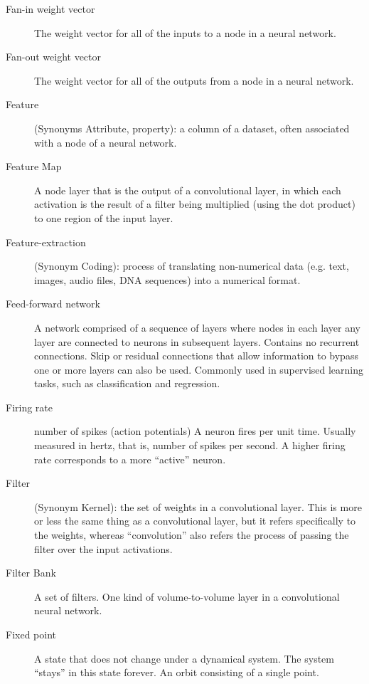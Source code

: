 \begin{description}
\item[Fan-in weight vector] The weight vector for all of the inputs to a node in a neural network.

\item[Fan-out weight vector] The weight vector for all of the outputs from a node in a neural network.

\item[Feature] (Synonyms Attribute, property): a column of a dataset, often associated with a node of a neural network.

\item[Feature Map] A node layer that is the output of a convolutional layer, in which each activation is the result of a filter being multiplied (using the dot product) to one region of the input layer.

\item[Feature-extraction] (Synonym Coding):  process of translating non-numerical data (e.g. text, images, audio files, DNA sequences) into a numerical format. %

\item[Feed-forward network] A network comprised of a sequence of layers where nodes in each layer any layer are connected to neurons in subsequent layers. Contains no recurrent connections. Skip or residual connections that allow information to bypass one or more layers can also be used. Commonly used in supervised learning tasks, such as classification and regression.

\item[Firing rate] number of spikes (action potentials) A neuron fires per unit time. Usually measured in hertz, that is, number of spikes per second. A higher firing rate corresponds to a more ``active'' neuron. 

\item[Filter] (Synonym Kernel): the set of weights in a convolutional layer. This is more or less the same thing as a convolutional layer, but it refers specifically to the weights, whereas ``convolution'' also refers the process of passing the filter over the input activations.

\item[Filter Bank] A set of filters. One kind of volume-to-volume layer in a convolutional neural network. 

\item[Fixed point] A state that does not change under a dynamical system. The system ``stays'' in this state forever. An orbit consisting of a single point.


\end{description}

